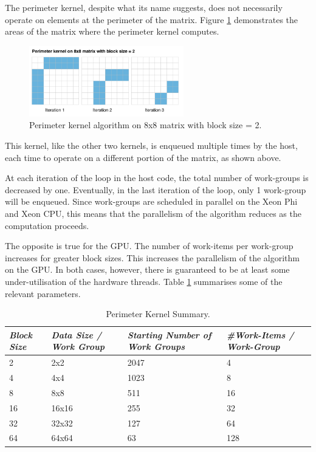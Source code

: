 \par{The perimeter kernel, despite what its name suggests, does not necessarily operate on elements 
    at the perimeter of the matrix. Figure \ref{PerimeterKernel2} demonstrates the areas of the matrix where the 
    perimeter kernel computes.}

\begin{figure}[!h]
    \centering
    \includegraphics[width=0.6\textwidth]{figures/PerimeterKernel2.png}
    \caption{Perimeter kernel algorithm on 8x8 matrix with block size = 2.}
    \label{PerimeterKernel2}
\end{figure}

\par{This kernel, like the other two kernels, is enqueued multiple times by the host, each 
    time to operate on a different portion of the matrix, as shown above.}

\par{At each iteration of the loop in the host code, the total number of work-groups is decreased by one. 
    Eventually, in the last iteration of the loop, only 1 work-group will be enqueued. 
    Since work-groups are scheduled in parallel on the Xeon Phi and Xeon CPU, 
    this means that the parallelism of the algorithm reduces as the computation proceeds.}

\par{The opposite is true for the GPU. The number of work-items per work-group increases for greater block sizes. 
    This increases the parallelism of the algorithm on the GPU. In both cases, however, 
    there is guaranteed to be at least some under-utilisation of the hardware threads. 
    Table \ref{tab:lu2} summarises some of the relevant parameters.}

\begin{table}[!h]
    \centering
    \begin{tabular}{| l | l | l | l |}
    \hline
    \emph{Block Size} & \emph{Data Size / Work Group} & \emph{Starting Number of Work Groups} & \emph{\#Work-Items / Work-Group} \\ \hline
    2 & 2x2 & 2047 & 4 \\ \hline
    4 & 4x4 & 1023 & 8 \\ \hline
    8 & 8x8 & 511 & 16 \\ \hline
    16 & 16x16 & 255 & 32 \\ \hline
    32 & 32x32 & 127 & 64 \\ \hline
    64 & 64x64 & 63 & 128 \\ \hline
    \end{tabular}
    \caption{Perimeter Kernel Summary.}
    \label{tab:lu2}
\end{table}

